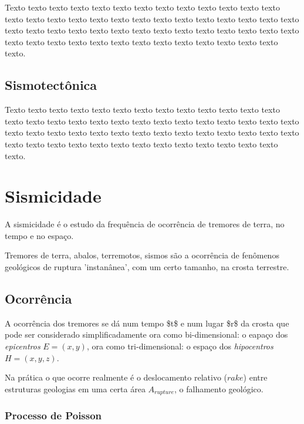Texto texto texto texto texto texto texto texto texto texto texto texto texto
texto texto texto texto texto texto texto texto texto texto texto texto texto
texto texto texto texto texto texto texto texto texto texto texto texto texto
texto texto texto texto texto texto texto texto texto texto texto texto texto
texto texto texto.

\subsection{Sismotectônica}
\label{sec:fundamentos}

Texto texto texto texto texto texto texto texto texto texto texto texto texto
texto texto texto texto texto texto texto texto texto texto texto texto texto
texto texto texto texto texto texto texto texto texto texto texto texto texto
texto texto texto texto texto texto texto texto texto texto texto texto texto
texto texto texto.



\section{Sismicidade}
\label{sec:risco_sismico}

A sismicidade é o estudo da frequência de ocorrência de tremores de terra, no
tempo e no espaço.

Tremores de terra, abalos, terremotos, sismos são a ocorrência de
fenômenos geológicos de ruptura 'instanânea', com um certo tamanho, na
crosta terrestre.


\subsection{Ocorrência}
\label{sec:risco_sismico}
 
A ocorrência dos tremores se dá num tempo \ac{$t$} e num lugar \ac{$r$} da
crosta que pode ser considerado simplificadamente ora como
bi-dimensional: o eapaço dos \emph{epicentros} $ E = {(x,y)}$, ora como
tri-dimensional: o espaço dos \emph{hipocentros} $ H = {(x,y,z)}$.

Na prática o que ocorre realmente é o deslocamento relativo (\emph{$rake$})
entre estruturas geologias em uma certa área \emph{$A_{rupture}$}, o falhamento geológico.


\subsubsection{Processo de Poisson}
\label{sec:risco_sismico}

